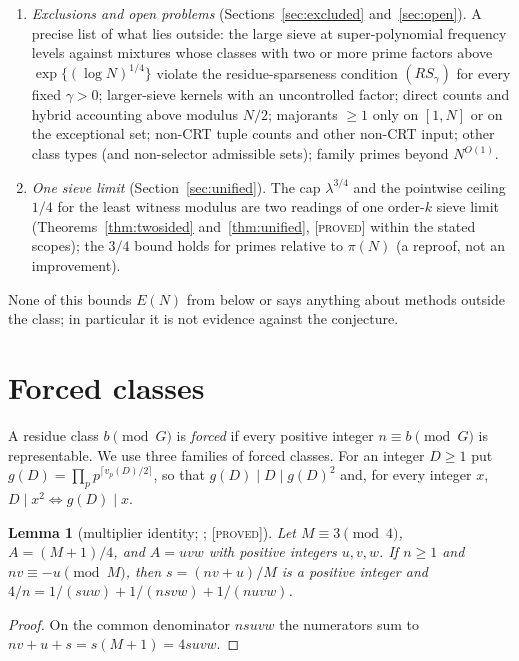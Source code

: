 \documentclass[10pt,reqno]{amsart}
\newtheorem{lemma}[theorem]{Lemma}
\theoremstyle{definition}
\theoremstyle{remark}
\newcommand{\lab}[1]{\textup{[\textsc{#1}]}}
\begin{document}
\begin{enumerate}
  literal hypothesis meets forced zeros above $\theta=2/3$
  (Theorem~\ref{thm:forcedmass}); the alternating form
  (Hypothesis~\ref{hyp:TCalt}) cancels them and still suffices
  (Theorem~\ref{thm:euler}).  Under CRT-main-term evaluation, input of
  prime order $k$ saves at most $C_A[(\log N)^{3/4}+k\log\log N]$, by a cap with
  truncated weights (Theorem~\ref{thm:trunc}, Corollary~\ref{cor:primeorder}).
\item \emph{Exclusions and open problems} (Sections~\ref{sec:excluded}
  and~\ref{sec:open}).  A precise list of what lies outside: the large
  sieve at super-polynomial frequency levels against mixtures whose classes
  with two or more prime factors above $\exp\{(\log N)^{1/4}\}$ violate the
  residue-sparseness condition $(RS_\gamma)$ for every fixed $\gamma>0$; larger-sieve kernels with
  an uncontrolled factor; direct counts and hybrid accounting above
  modulus $N/2$; majorants $\geq1$ only on $[1,N]$ or on the exceptional
  set; non-CRT tuple counts and other non-CRT input; other class types
  (and non-selector admissible sets); family primes beyond $N^{O(1)}$.
\item \emph{One sieve limit} (Section~\ref{sec:unified}).  The cap $\lambda^{3/4}$ and the
  pointwise ceiling $1/4$ for the least witness modulus are two readings
  of one order-$k$ sieve limit (Theorems~\ref{thm:twosided}
  and~\ref{thm:unified}, \lab{proved} within the stated scopes); the $3/4$ bound
  holds for primes relative to $\pi(N)$ (a reproof, not an improvement).
\end{enumerate}
None of this bounds $E(N)$ from below or says anything about methods
outside the class; in particular it is not evidence against the
conjecture.

\section{Forced classes}\label{sec:forced}

A residue class $b\pmod G$ is \emph{forced} if every positive integer
$n\equiv b\pmod G$ is representable.  We use three families of forced
classes.  For an integer $D\geq1$ put
$g(D)=\prod_pp^{\lceil v_p(D)/2\rceil}$, so that $g(D)\mid D\mid g(D)^2$
and, for every integer $x$, $D\mid x^2\iff g(D)\mid x$.

\begin{lemma}[multiplier identity; {\cite[Lemma~2.1]{LL}}; \lab{proved}]\label{lem:identity}
Let $M\equiv3\pmod4$, $A=(M+1)/4$, and $A=uvw$ with positive integers
$u,v,w$.  If $n\geq1$ and $nv\equiv-u\pmod M$, then $s=(nv+u)/M$ is a
positive integer and $4/n=1/(suw)+1/(nsvw)+1/(nuvw)$.
\end{lemma}
\begin{proof}
On the common denominator $nsuvw$ the numerators sum to
$nv+u+s=s(M+1)=4suvw$.
\end{proof}
\end{document}
